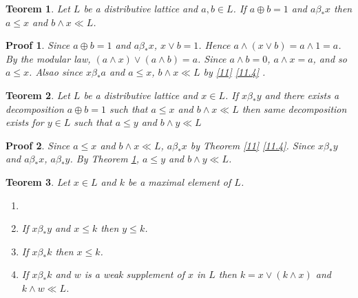 \documentclass[a4paper,12pt]{article}
\numberwithin{equation}{section}
\theoremstyle{italik}
\newtheorem{teorem}{Teorem}[section]
\newtheorem*{ispat}{Proof}
\begin{document}
\begin{teorem}\label{12}
  Let $ L $ be a distributive lattice and $ a,b \in L $. If $ a \oplus b = 1 $ and $ a \beta_* x $ 
  then $ a \leq x $ and $ b \wedge x \ll L $.
\end{teorem}
\begin{ispat}
    Since $ a \oplus b = 1 $ and $ a \beta_* x $, $ x \vee b = 1 $. Hence $ a \wedge ( x \vee b ) = a \wedge 1 = a $. 
    By the modular law, $ ( a \wedge x ) \vee ( a \wedge b ) = a $. Since $ a \wedge b = 0 $, 
    $ a \wedge x = a $, and so $ a \leq x $. Alsao since $ x \beta_* a $ and $ a \leq x $, 
    $ b \wedge x \ll L $ by \ref{11} \ref{11.4} .
\end{ispat}


\begin{teorem}\label{13}
    Let $ L $ be a distributive lattice and $ x \in L $. If $ x \beta_* y $ and there exists a 
    decomposition $ a \oplus b = 1 $ such that $ a \leq x $ and $ b \wedge x \ll L $ then same 
    decomposition exists for $ y \in L $ such that $ a \leq y $ and $ b \wedge y \ll L $
\end{teorem}
\begin{ispat}
    Since $ a \leq x $ and $ b \wedge x \ll L $, $ a \beta_* x $ by Theorem \ref{11} \ref{11.4}. 
    Since $ x \beta_* y $ and $ a \beta_* x $, $ a \beta_* y $. 
    By Theorem \ref{12}, $ a \leq y $ and $ b \wedge y \ll L $.
\end{ispat}

%
%
%
%
%
%

\begin{teorem}\label{14}
    Let $ x \in L $ and $ k $ be a maximal element of $ L $.
    \begin{enumerate}[label=(\roman{*}), ref=(\roman{*})]
        \item 
            \label{14.1}
        \item
            If $ x \beta_*y $ and $ x \leq k $ then $ y \leq k $. \label{14.2}
        \item
            If $ x \beta_* k $ then $ x \leq k $. \label{14.3}
        \item
            If $ x \beta_* k $ and $ w $ is a weak supplement of $ x $ in $ L $ then $ k = x \vee ( k \wedge x ) $ 
            and  $ k \wedge w \ll L $. \label{14.4}
    \end{enumerate}
\end{teorem}
\end{document}
